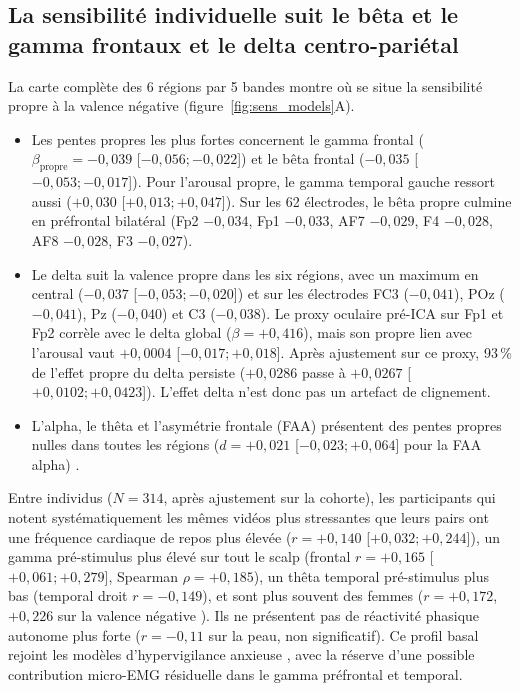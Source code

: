 \documentclass[10pt]{article}
\begin{document}
\subsection{La sensibilité individuelle suit le bêta et le gamma frontaux et le delta centro-pariétal}

La carte complète des 6 régions par 5 bandes montre où se situe la sensibilité propre à la valence négative (figure~\ref{fig:sens_models}A).
\begin{itemize}
\item Les pentes propres les plus fortes concernent le gamma frontal ($\beta_{\text{propre}} = -0{,}039$ [$-0{,}056 ; -0{,}022$]) et le bêta frontal ($-0{,}035$ [$-0{,}053 ; -0{,}017$]). Pour l'arousal propre, le gamma temporal gauche ressort aussi ($+0{,}030$ [$+0{,}013 ; +0{,}047$]). Sur les 62 électrodes, le bêta propre culmine en préfrontal bilatéral (Fp2 $-0{,}034$, Fp1 $-0{,}033$, AF7 $-0{,}029$, F4 $-0{,}028$, AF8 $-0{,}028$, F3 $-0{,}027$).
\item Le delta suit la valence propre dans les six régions, avec un maximum en central ($-0{,}037$ [$-0{,}053 ; -0{,}020$]) et sur les électrodes FC3 ($-0{,}041$), POz ($-0{,}041$), Pz ($-0{,}040$) et C3 ($-0{,}038$). Le proxy oculaire pré-ICA sur Fp1 et Fp2 corrèle avec le delta global ($\beta = +0{,}416$), mais son propre lien avec l'arousal vaut $+0{,}0004$ [$-0{,}017 ; +0{,}018$]. Après ajustement sur ce proxy, 93\,\% de l'effet propre du delta persiste ($+0{,}0286$ passe à $+0{,}0267$ [$+0{,}0102 ; +0{,}0423$]). L'effet delta n'est donc pas un artefact de clignement.
\item L'alpha, le thêta et l'asymétrie frontale (FAA) présentent des pentes propres nulles dans toutes les régions ($d = +0{,}021$ [$-0{,}023 ; +0{,}064$] pour la FAA alpha) \cite{vandervinne2017}.
\end{itemize}

Entre individus ($N = 314$, après ajustement sur la cohorte), les participants qui notent systématiquement les mêmes vidéos plus stressantes que leurs pairs ont une fréquence cardiaque de repos plus élevée ($r = +0{,}140$ [$+0{,}032 ; +0{,}244$]), un gamma pré-stimulus plus élevé sur tout le scalp (frontal $r = +0{,}165$ [$+0{,}061 ; +0{,}279$], Spearman $\rho = +0{,}185$), un thêta temporal pré-stimulus plus bas (temporal droit $r = -0{,}149$), et sont plus souvent des femmes ($r = +0{,}172$, $+0{,}226$ sur la valence négative \cite{bradley2001}). Ils ne présentent pas de réactivité phasique autonome plus forte ($r = -0{,}11$ sur la peau, non significatif). Ce profil basal rejoint les modèles d'hypervigilance anxieuse \cite{oathes2008}, avec la réserve d'une possible contribution micro-EMG résiduelle dans le gamma préfrontal et temporal.
\end{document}
